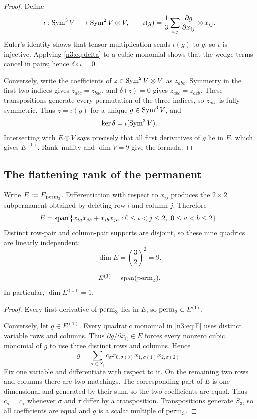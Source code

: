 \begin{proof}
Define
\[
  \iota:\operatorname{Sym}^3V\longrightarrow\operatorname{Sym}^2V\otimes V,
  \qquad
  \iota(g)=\frac13\sum_{i,j}
  \frac{\partial g}{\partial x_{ij}}\otimes x_{ij}.
\]
Euler's identity shows that tensor multiplication sends \(\iota(g)\) to
\(g\), so \(\iota\) is injective. Applying \eqref{n3:eq:delta} to a cubic
monomial shows that the wedge terms cancel in pairs; hence
\(\delta\circ\iota=0\).

Conversely, write the coefficients of \(z\in\operatorname{Sym}^2V\otimes V\) as
\(z_{abc}\). Symmetry in the first two indices gives
\(z_{abc}=z_{bac}\), and \(\delta(z)=0\) gives
\(z_{abc}=z_{acb}\). These transpositions generate every permutation of the
three indices, so \(z_{abc}\) is fully symmetric. Thus \(z=\iota(g)\) for a
unique \(g\in\operatorname{Sym}^3V\), and
\[
  \ker\delta=\iota(\operatorname{Sym}^3V).
\]
Intersecting with \(E\otimes V\) says precisely that all first derivatives of
\(g\) lie in \(E\), which gives \(E^{(1)}\). Rank--nullity and \(\dim V=9\)
give the formula.
\end{proof}

\subsection{The flattening rank of the permanent}

Write \(E:=E_{\operatorname{perm}_3}\). Differentiation with respect to \(x_{ij}\)
produces the \(2\times2\) subpermanent obtained by deleting row \(i\) and
column \(j\). Therefore
\begin{equation}\label{n3:eq:E}
  E=\operatorname{span}\left\{x_{ia}x_{jb}+x_{ib}x_{ja}:
  0\leq i<j\leq2,\ 0\leq a<b\leq2\right\}.
\end{equation}
Distinct row-pair and column-pair supports are disjoint, so these nine
quadrics are linearly independent:
\begin{equation}\label{n3:eq:E-dim}
  \dim E=\binom32^2=9.
\end{equation}

\begin{proposition}\label{n3:prop:prolongation}
\[
  E^{(1)}=\operatorname{span}(\operatorname{perm}_3).
\]
In particular, \(\dim E^{(1)}=1\).
\end{proposition}

\begin{proof}
Every first derivative of \(\operatorname{perm}_3\) lies in \(E\), so
\(\operatorname{perm}_3\in E^{(1)}\).

Conversely, let \(g\in E^{(1)}\). Every quadratic monomial in
\eqref{n3:eq:E} uses distinct variable rows and columns. Thus
\(\partial g/\partial x_{ij}\in E\) forces every nonzero cubic monomial of
\(g\) to use three distinct rows and columns. Hence
\[
  g=\sum_{\sigma\in S_3}c_{\sigma}
  x_{0,\sigma(0)}x_{1,\sigma(1)}x_{2,\sigma(2)}.
\]
Fix one variable and differentiate with respect to it. On the remaining two
rows and columns there are two matchings. The corresponding part of \(E\) is
one-dimensional and generated by their sum, so the two coefficients are
equal. Thus \(c_\sigma=c_\tau\) whenever \(\sigma\) and \(\tau\) differ by a
transposition. Transpositions generate \(S_3\), so all coefficients are equal
and \(g\) is a scalar multiple of \(\operatorname{perm}_3\).
\end{proof}

